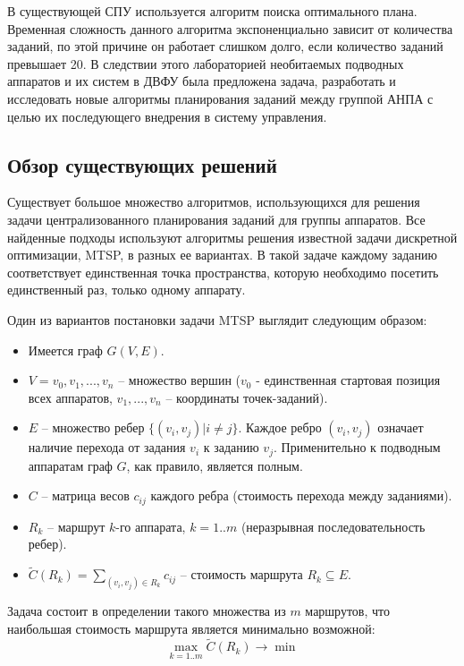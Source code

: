 \documentclass[a4paper,14pt,russian]{article}
\begin{document}
В существующей СПУ используется алгоритм поиска оптимального плана.
Временная сложность данного алгоритма экспоненциально зависит от количества заданий, по этой причине он работает слишком долго, если количество заданий превышает 20. %
В следствии этого лабораторией необитаемых подводных аппаратов и их систем в ДВФУ была предложена задача, разработать и исследовать новые алгоритмы планирования заданий между группой АНПА с целью их последующего внедрения в систему управления.

\subsection{Обзор существующих решений} \label{mtsp-graph}

Существует большое множество алгоритмов, использующихся для решения задачи централизованного планирования заданий для группы аппаратов.
Все найденные подходы используют алгоритмы решения известной задачи дискретной оптимизации, MTSP, в разных ее вариантах.
В такой задаче каждому заданию соответствует единственная точка пространства, которую необходимо посетить единственный раз, только одному аппарату.

Один из вариантов постановки задачи MTSP выглядит следующим образом:
\begin{itemize}
\item Имеется граф $G(V, E)$.
\item $V = {v_0, v_1, ... , v_n}$ -- множество вершин ($v_0$ - единственная стартовая позиция всех аппаратов, $v_1, ..., v_n$ -- координаты точек-заданий).
\item $E$ -- множество ребер $\{(v_i, v_j) | i \neq j\}$. Каждое ребро $(v_i, v_j)$ означает наличие перехода от задания $v_i$ к заданию $v_j$. Применительно к подводным аппаратам граф $G$, как правило, является полным.
\item $C$ -- матрица весов $c_{i j}$ каждого ребра (стоимость перехода между заданиями).
\item $R_k$ -- маршрут $k$-го аппарата, $k=1..m$ (неразрывная последовательность ребер).
\item $\widetilde{C}(R_k) = \displaystyle\sum_{(v_i, v_j) \in R_k} c_{i j}$ -- стоимость маршрута $R_k \subseteq E$.
\end{itemize}
Задача состоит в определении такого множества из $m$ маршрутов, что наибольшая стоимость маршрута является минимально возможной:
\begin{equation} \label{mtsp1}
\displaystyle \max_{k=1..m} \widetilde{C}(R_k) \rightarrow \min
\end{equation}
\end{document}
